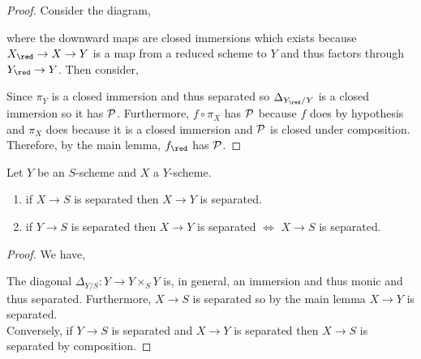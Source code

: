 \documentclass[12pt]{article}
\begin{document}
\begin{proof}
Consider the diagram,
\begin{center}
\end{center}
where the downward maps are closed immersions which exists because $X_{\red} \to X \to Y$ is a map from a reduced scheme to $Y$ and thus factors through $Y_{\red} \to Y$. Then consider,
\begin{center}
\end{center} 
Since $\pi_Y$ is a closed immersion and thus separated so $\Delta_{Y_\red / Y}$ is a closed immersion so it has $\mathcal{P}$. Furthermore, $f \circ \pi_X$ has $\mathcal{P}$ because $f$ does by hypothesis and $\pi_X$ does because it is a closed immersion and $\mathcal{P}$ is closed under composition. Therefore, by the main lemma, $f_{\red}$ has $\mathcal{P}$.
\end{proof}


\begin{cor}
Let $Y$ be an $S$-scheme and $X$ a $Y$-scheme.
\begin{enumerate}
\item if $X \to S$ is separated then $X \to Y$ is separated.
\item if $Y \to S$ is separated then $X \to Y$ is separated $\iff$ $X \to S$ is separated.
\end{enumerate}
\end{cor}

\begin{proof}
We have,
\begin{center}
\end{center}
The diagonal $\Delta_{Y/S} : Y \to Y \times_S Y$ is, in general, an immersion and thus monic and thus separated. Furthermore, $X \to S$ is separated so by the main lemma $X \to Y$ is separated. 
\bigskip\\
Conversely, if $Y \to S$ is separated and $X \to Y$ is separated then $X \to S$ is separated by composition.
\end{proof}
\end{document}
